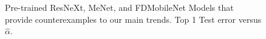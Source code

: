 \begin{figure}[!htb]
{      \label{fig:menet-net}
   }
   \caption{
      Pre-trained 
      ResNeXt, MeNet, and FDMobileNet
      Models 
      that provide counterexamples to our main trends.
      Top 1 Test error versus
      $\hat{\alpha}$.
           }
   \label{fig:counter-examples}
\end{figure}


